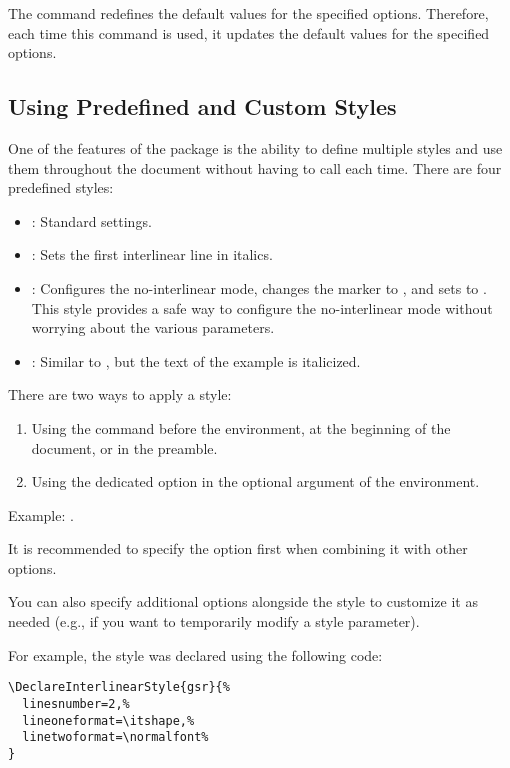 \documentclass{article}
\begin{document}
The  command redefines the default values for the specified options. Therefore, each time this command is used, it updates the default values for the specified options.

\subsection{Using Predefined and Custom Styles}
One of the features of the  package is the ability to define multiple styles and use them throughout the document without having to call  each time. There are four predefined styles:

\begin{itemize}
    \item {}: Standard settings.
    \item {}: Sets the first interlinear line in italics.
    \item {}: Configures the no-interlinear mode, changes the  marker to , and sets  to . This style provides a safe way to configure the no-interlinear mode without worrying about the various parameters.
    \item {}: Similar to , but the text of the example is italicized.
\end{itemize}

There are two ways to apply a style:
\begin{enumerate}
\item Using the  command before the  environment, at the beginning of the document, or in the preamble.
\item Using the dedicated  option in the optional argument of the  environment.
\end{enumerate}

Example: .

It is recommended to specify the  option first when combining it with other options.

You can also specify additional options alongside the style to customize it as needed (e.g., if you want to temporarily modify a style parameter).

For example, the  style was declared using the following code:
\begin{verbatim}
\DeclareInterlinearStyle{gsr}{%
  linesnumber=2,%
  lineoneformat=\itshape,%
  linetwoformat=\normalfont%
}
\end{verbatim}
\end{document}
